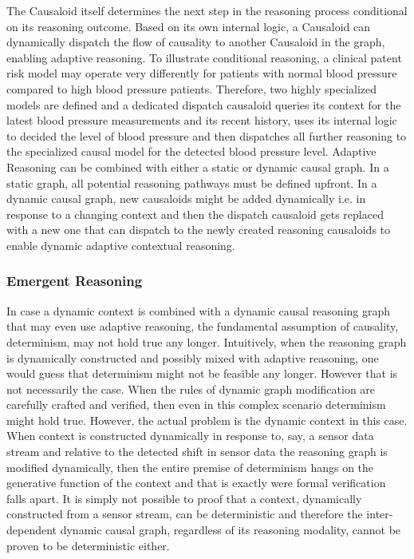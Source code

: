 The Causaloid itself determines the next step in the reasoning process conditional on its reasoning outcome. Based on its own internal logic, a Causaloid can dynamically dispatch the flow of causality to another Causaloid in the graph, enabling adaptive reasoning. To illustrate conditional reasoning, a clinical patent risk model may operate very differently for patients with normal blood pressure compared to high blood pressure patients. Therefore, two highly specialized models are defined and a dedicated dispatch causaloid queries its context for the latest blood pressure measurements and its recent history, uses its internal logic to decided the level of blood pressure and then dispatches all further reasoning to the specialized causal model for the detected blood pressure level. Adaptive Reasoning can be combined with either a static or dynamic causal graph. In a static graph, all potential reasoning pathways must be defined upfront. In a dynamic causal graph, new causaloids might be added dynamically i.e. in response to a changing context and then the dispatch causaloid gets replaced with a new one that can dispatch to the newly created reasoning causaloids to enable dynamic adaptive contextual reasoning.  

\subsubsection{Emergent Reasoning}

In case a dynamic context is combined with a dynamic causal reasoning graph that may even use adaptive reasoning, the fundamental assumption of causality, determinism, may not hold true any longer. Intuitively, when the reasoning graph is dynamically constructed and possibly mixed with adaptive reasoning, one would guess that determinism might not be feasible any longer. However that is not necessarily the case. When the rules of dynamic graph modification are carefully crafted and verified, then even in this complex scenario determinism might hold true. However, the actual problem is the dynamic context in this case. When context is constructed dynamically in response to, say, a sensor data stream and relative to the detected shift in sensor data the reasoning graph is modified dynamically, then the entire premise of determinism hangs on the generative function of the context and that is exactly were formal verification falls apart. It is simply not possible to proof that a context, dynamically constructed from a sensor stream, can be deterministic and therefore the inter-dependent dynamic causal graph, regardless of its reasoning modality, cannot be proven to be deterministic either. 


